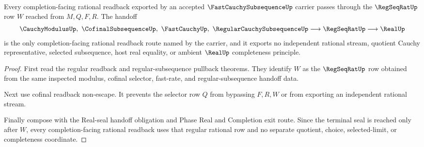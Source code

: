 \begin{theorem}
\label{thm:fast-cauchy-subsequence-regseqrat-completion-handoff}
Every completion-facing rational readback exported by an accepted $\FastCauchySubsequenceUp$ carrier passes through the $\RegSeqRatUp$ row $W$ reached from $M,Q,F,R$. The handoff
$$
\CauchyModulusUp,\ \CofinalSubsequenceUp,\ \FastCauchyUp,\ \RegularCauchySubsequenceUp \longrightarrow \RegSeqRatUp \longrightarrow \RealUp
$$
is the only completion-facing rational readback route named by the carrier, and it exports no independent rational stream, quotient Cauchy representative, selected subsequence, host real equality, or ambient $\RealUp$ completeness principle.
\end{theorem}
\begin{proof}
First read the regular readback and regular-subsequence pullback theorems. They identify $W$ as the $\RegSeqRatUp$ row obtained from the same inspected modulus, cofinal selector, fast-rate, and regular-subsequence handoff data.

Next use cofinal readback non-escape. It prevents the selector row $Q$ from bypassing $F,R,W$ or from exporting an independent rational stream.

Finally compose with the Real-seal handoff obligation and Phase Real and Completion exit route. Since the terminal seal is reached only after $W$, every completion-facing rational readback uses that regular rational row and no separate quotient, choice, selected-limit, or completeness coordinate.
\end{proof}


